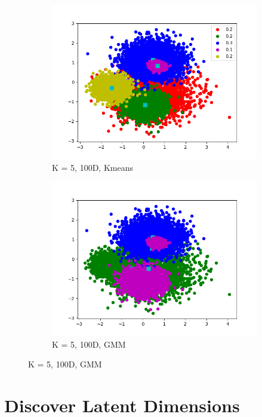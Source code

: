 \documentclass[12pt,letterpaper]{article}
\begin{document}
\begin{figure}
    \centering
    \begin{subfigure}[b]{0.45\textwidth}
        \includegraphics[width=\textwidth]{imgs/kmeans_100D.png}
        \caption{K = 5, 100D, Kmeans}
        \label{kmeans_100D}
    \end{subfigure}
    \begin{subfigure}[b]{0.45\textwidth}
        \includegraphics[width=\textwidth]{imgs/GMM_100D.png}
        \caption{K = 5, 100D, GMM}
        \label{GMM_100D}
    \end{subfigure}
\end{figure}

\section{Discover Latent Dimensions}
\end{document}
